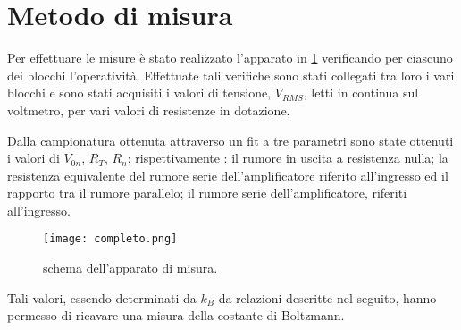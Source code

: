 \section{Metodo di misura}

	Per effettuare le misure è stato realizzato l'apparato in \figurename{ \ref{fig:completo}}
	verificando per ciascuno dei blocchi l'operatività.
	Effettuate tali verifiche sono stati collegati tra loro i vari blocchi
	e sono stati acquisiti i valori di tensione, $V_{RMS}$, letti in continua sul voltmetro,
	per vari valori di resistenze in dotazione.

	Dalla campionatura ottenuta attraverso un fit a tre parametri sono state ottenuti i valori
	di $V_{0n}$, $R_{T}$, $R_{n}$; rispettivamente : il rumore in uscita a resistenza nulla; la resistenza equivalente del rumore serie dell'amplificatore riferito all'ingresso ed il rapporto tra il rumore parallelo; il rumore serie dell’amplificatore, riferiti all’ingresso.

	\begin{figure}[h]
			\centering
			\texttt{[image: completo.png]}
			\caption{schema dell'apparato di misura.}
			\label{fig:completo}
	\end{figure}

	Tali valori, essendo determinati da $k_{B}$ da relazioni descritte nel seguito, hanno permesso
	di ricavare una misura della costante di Boltzmann.
